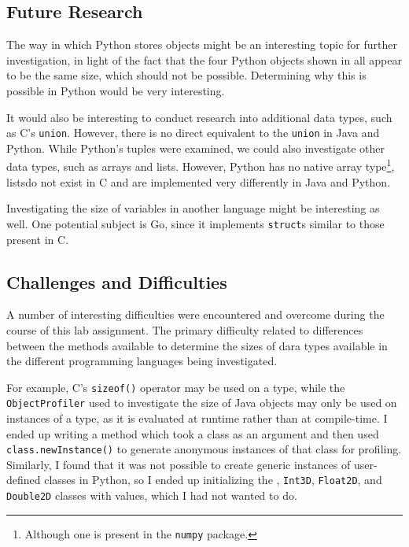 \documentclass[12pt,letterpaper]{article}
\begin{document}
		\subsection{Future Research}

			The way in which Python stores objects might be an interesting topic for further investigation, in light of the fact that the four Python objects shown in  all appear to be the same size, which should not be possible. Determining why this is possible in Python would be very interesting.

			It would also be interesting to conduct research into additional data types, such as C's \texttt{union}. However, there is no direct equivalent to the \texttt{union} in Java and Python. While Python's tuples were examined, we could also investigate other data types, such as arrays and lists. However, Python has no native array type\footnote{Although one is present in the \texttt{numpy} package.}, listsdo not exist in C and are implemented very differently in Java and Python.

			Investigating the size of variables in another language might be interesting as well. One potential subject is Go, since it implements \texttt{struct}s similar to those present in C. 

		\subsection{Challenges and Difficulties}

			A number of interesting difficulties were encountered and overcome during the course of this lab assignment. The primary difficulty related to differences between the methods available to determine the sizes of dara types available in the different programming languages being investigated.

			For example, C's \texttt{sizeof()} operator may be used on a type, while the \texttt{ObjectProfiler} used to investigate the size of Java objects may only be used on instances of a type, as it is evaluated at runtime rather than at compile-time. I ended up writing a method which took a class as an argument and then used \texttt{class.newInstance()} to generate anonymous instances of that class for profiling. Similarly, I found that it was not possible to create generic instances of user-defined classes in Python, so I ended up initializing the , \texttt{Int3D}, \texttt{Float2D}, and \texttt{Double2D} classes with values, which I had not wanted to do.
\end{document}
